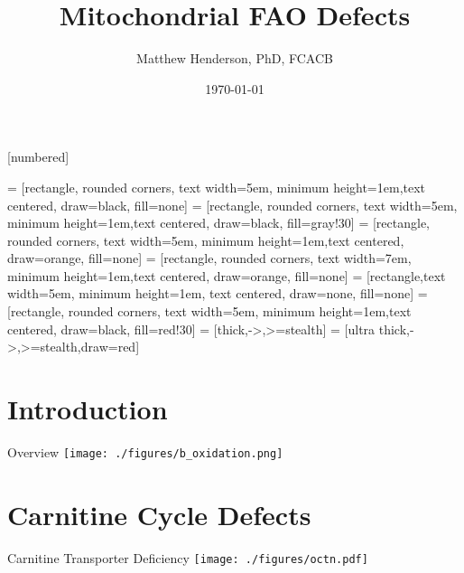 \documentclass[presentation, smaller]{beamer}
\author{Matthew Henderson, PhD, FCACB}
\date{\today}
\title{Mitochondrial FAO Defects}
\institute[NSO]{Newborn Screening Ontario | The University of Ottawa}
\begin{document}
\maketitle


\vspace{220pt}
\beamertemplatenavigationsymbolsempty
{}[numbered]

 = [rectangle, rounded corners, text width=5em, minimum height=1em,text centered, draw=black, fill=none]
 = [rectangle, rounded corners, text width=5em, minimum height=1em,text centered, draw=black, fill=gray!30]
 = [rectangle, rounded corners, text width=5em, minimum height=1em,text centered, draw=orange, fill=none]
 = [rectangle, rounded corners, text width=7em, minimum height=1em,text centered, draw=orange, fill=none]
 = [rectangle,text width=5em, minimum height=1em, text centered, draw=none, fill=none]
 = [rectangle, rounded corners, text width=5em, minimum height=1em,text centered, draw=black, fill=red!30]
 = [thick,->,>=stealth]
 = [ultra thick,->,>=stealth,draw=red]

\section{Introduction}
\label{sec:orgheadline2}
\begin{frame}[label={sec:orgheadline1}]{Overview}
\texttt{[image: ./figures/b\_oxidation.png]}
\end{frame}

\section{Carnitine Cycle Defects}
\label{sec:orgheadline13}
\begin{frame}[label={sec:orgheadline3}]{Carnitine Transporter Deficiency}
\texttt{[image: ./figures/octn.pdf]}
\end{frame}
\end{document}
